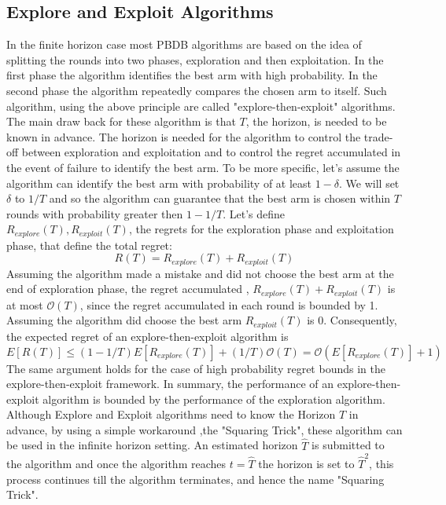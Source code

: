 \documentclass{llncs}
\begin{document}
\subsection{Explore and Exploit Algorithms}
	In the finite horizon case most PBDB algorithms are based on the idea of splitting the rounds into two phases, exploration and then exploitation. In the first phase the algorithm identifies the best arm with high probability. In the second phase the algorithm repeatedly compares the chosen arm to itself.
	Such algorithm, using the above principle are called "explore-then-exploit" algorithms.
	The main draw back for these algorithm is that $T$, the horizon, is needed to be known in advance. The horizon is needed for the algorithm to control the trade-off between exploration and exploitation and to control the regret accumulated in the event of failure to identify the best arm.
	To be more specific, let's assume the algorithm can identify the best arm with probability of at least $1-\delta$. We will set $\delta$ to $1/T$ and so the algorithm can guarantee that the best arm is chosen within $T$ rounds with probability greater then $1-1/T$.
	Let's define $R_{explore}(T),R_{exploit}(T)$, the regrets for the exploration phase and exploitation phase, that define the total regret:
	$$R(T) = R_{explore}(T)+R_{exploit}(T)$$
	Assuming the algorithm made a mistake and did not choose the best arm at the end of exploration phase, the regret accumulated , $R_{explore}(T)+R_{exploit}(T)$ is at most $\mathcal{O}(T)$, since the regret accumulated in each round is bounded by 1.
	Assuming the algorithm did choose the best arm $R_{exploit}(T)$ is $0$.
	Consequently, the expected regret of an explore-then-exploit algorithm is
	\begin{equation}
		E[R(T)] \leq (1-1/T)E[R_{explore}(T)] +(1/T)\mathcal{O}(T) = \mathcal{O}(E[R_{explore}(T)]+1)
	\end{equation}
	The same argument holds for the case of high probability regret bounds in the explore-then-exploit framework. 
	In summary, the performance of an explore-then-exploit algorithm is bounded by the performance of the exploration algorithm. 
	Although Explore and Exploit algorithms need to know the Horizon $T$ in advance, by using a simple workaround ,the "Squaring Trick", these algorithm can be used in the infinite horizon setting. An estimated horizon $\hat{T}$ is submitted to the algorithm and once the algorithm reaches $t=\hat{T}$ the horizon is set to $\hat{T}^2$, this process continues till the algorithm terminates, and hence the name "Squaring Trick".
	
\end{document}
